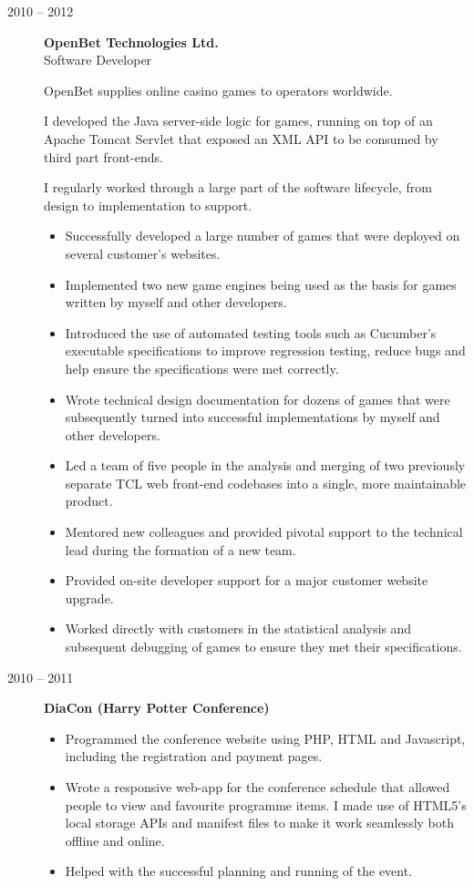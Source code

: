 \documentclass[10pt]{report}
\begin{document}
\begin{description}
  \pagebreak[2]
  \item[2010 -- 2012]
    \textbf{OpenBet Technologies Ltd.} \\
    Software Developer

    OpenBet supplies online casino games to operators worldwide.

    I developed the Java server-side logic for games, running on top of an Apache Tomcat Servlet that exposed an XML API to be consumed by third part front-ends.

    I regularly worked through a large part of the software lifecycle, from design to implementation to support.

    \begin{itemize}
      \item Successfully developed a large number of games that were deployed on several customer's websites.
      \item Implemented two new game engines being used as the basis for games written by myself and other developers.
      \item Introduced the use of automated testing tools such as Cucumber's executable specifications to improve regression testing, reduce bugs and help ensure the specifications were met correctly.
      \item Wrote technical design documentation for dozens of games that were subsequently turned into successful implementations by myself and other developers.
      \item Led a team of five people in the analysis and merging of two previously separate TCL web front-end codebases into a single, more maintainable product.
      \item Mentored new colleagues and provided pivotal support to the technical lead during the formation of a new team.
      \item Provided on-site developer support for a major customer website upgrade.
      \item Worked directly with customers in the statistical analysis and subsequent debugging of games to ensure they met their specifications.
    \end{itemize}

  \pagebreak[2]
  \item[2010 -- 2011]
    \textbf{DiaCon (Harry Potter Conference)}
    \begin{itemize}
      \item Programmed the conference website using PHP, HTML and Javascript, including the registration and payment pages.
      \item Wrote a responsive web-app for the conference schedule that allowed people to view and favourite programme items. I made use of HTML5's local storage APIs and manifest files to make it work seamlessly both offline and online.
      \item Helped with the successful planning and running of the event.
    \end{itemize}


\end{description}
\end{document}
